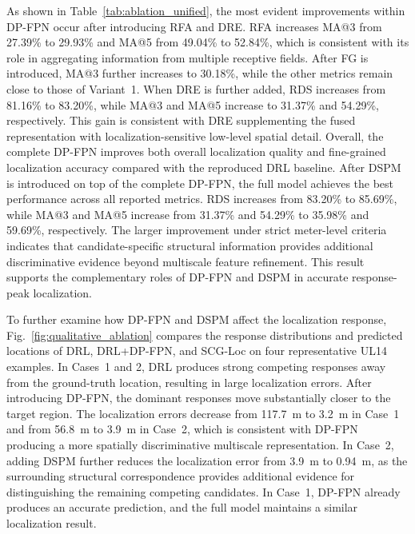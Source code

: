 \documentclass[runningheads]{llncs}
\begin{document}
As shown in Table~\ref{tab:ablation_unified}, the most evident improvements within DP-FPN occur after introducing RFA and DRE. RFA increases MA@3 from 27.39\% to 29.93\% and MA@5 from 49.04\% to 52.84\%, which is consistent with its role in aggregating information from multiple receptive fields. After FG is introduced, MA@3 further increases to 30.18\%, while the other metrics remain close to those of Variant~1. When DRE is further added, RDS increases from 81.16\% to 83.20\%, while MA@3 and MA@5 increase to 31.37\% and 54.29\%, respectively. This gain is consistent with DRE supplementing the fused representation with localization-sensitive low-level spatial detail. Overall, the complete DP-FPN improves both overall localization quality and fine-grained localization accuracy compared with the reproduced DRL baseline. After DSPM is introduced on top of the complete DP-FPN, the full model achieves the best performance across all reported metrics. RDS increases from 83.20\% to 85.69\%, while MA@3 and MA@5 increase from 31.37\% and 54.29\% to 35.98\% and 59.69\%, respectively. The larger improvement under strict meter-level criteria indicates that candidate-specific structural information provides additional discriminative evidence beyond multiscale feature refinement. This result supports the complementary roles of DP-FPN and DSPM in accurate response-peak localization.

To further examine how DP-FPN and DSPM affect the localization response, Fig.~\ref{fig:qualitative_ablation} compares the response distributions and predicted locations of DRL, DRL+DP-FPN, and SCG-Loc on four representative UL14 examples. In Cases~1 and 2, DRL produces strong competing responses away from the ground-truth location, resulting in large localization errors. After introducing DP-FPN, the dominant responses move substantially closer to the target region. The localization errors decrease from 117.7~m to 3.2~m in Case~1 and from 56.8~m to 3.9~m in Case~2, which is consistent with DP-FPN producing a more spatially discriminative multiscale representation. In Case~2, adding DSPM further reduces the localization error from 3.9~m to 0.94~m, as the surrounding structural correspondence provides additional evidence for distinguishing the remaining competing candidates. In Case~1, DP-FPN already produces an accurate prediction, and the full model maintains a similar localization result.
\end{document}
